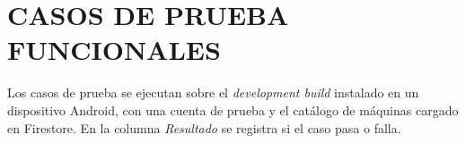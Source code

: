 \chapter{CASOS DE PRUEBA FUNCIONALES}
\label{anx:casos}

Los casos de prueba se ejecutan sobre el \emph{development build} instalado
en un dispositivo Android, con una cuenta de prueba y el catálogo de máquinas
cargado en Firestore. En la columna \emph{Resultado} se registra si el caso
pasa o falla.

\newcommand{\cpres}{\textcolor{black!45}{\footnotesize\shortstack[l]{$\square$ Pasa\\$\square$ Falla}}}

